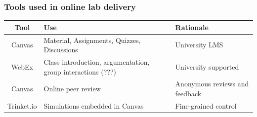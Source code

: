\documentclass[aspectratio=169,shadow=true]{beamer}
\begin{document}
%
%
%
%
%

{\nologo
\begin{frame}
\frametitle{Tools used in online lab delivery}
\begin{center}
\renewcommand{\arraystretch}{1.5}
\begin{tabular}{cll}
\hline\hline
\textbf{Tool} & \textbf{Use} & \textbf{Rationale} \\
\hline
Canvas & \parbox[t]{2in}{\raggedright Material, Assignments, Quizzes, Discussions }& University LMS\\
WebEx & \parbox[t]{2in}{\raggedright Class introduction, argumentation, group interactions (???)} & University supported\\
Canvas & \parbox[t]{2in}{\raggedright Online peer review} & \parbox[t]{2in}{\raggedright Anonymous reviews and feedback}\\
Trinket.io & \parbox[t]{2in}{\raggedright Simulations embedded in Canvas} & Fine-grained control\\[3ex]
\hline\hline
\end{tabular}
\end{center}
\end{frame}
}
\end{document}
